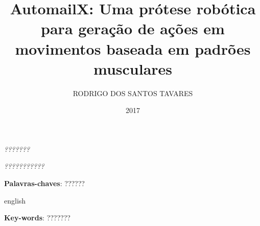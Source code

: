 \documentclass[
	12pt,				%
    oneside,
	a4paper,			%
	chapter=TITLE,		%
	english,			%
	brazil				%
	]{abntex2}
\title{AutomailX\todo{Alterar o título}: Uma prótese robótica para geração de ações em movimentos baseada em padrões musculares}
\author{RODRIGO DOS SANTOS TAVARES}
\date{2017}
\begin{document}
\frenchspacing


\imprimircapa{}

\imprimirfolhaderosto{}

\imprimirfolhadeaprovacao{}
\begin{dedicatoria}
   \vspace*{\fill}
   \centering
   \noindent
   \textit{???????} \vspace*{\fill}%
\end{dedicatoria}

\begin{agradecimentos}
  \textcolor{red}{\lipsum[1]}%
\end{agradecimentos}

\begin{epigrafe}
    \vspace*{\fill}
	\begin{flushright}
		\textit{???????????} %
	\end{flushright}
\end{epigrafe}


\setlength{\absparsep}{18pt} %
\begin{resumo}
  \textcolor{red}{\lipsum[2]} %

 \vspace{\onelineskip}

 \noindent
 \textbf{Palavras-chaves}: ??????%
\end{resumo}


\begin{resumo}[Abstract]
 \begin{otherlanguage*}{english}
   \textcolor{red}{\lipsum[3]} %

   \vspace{\onelineskip}

   \noindent
   \textbf{Key-words}: ???????%
 \end{otherlanguage*}
\end{resumo}
\end{document}
